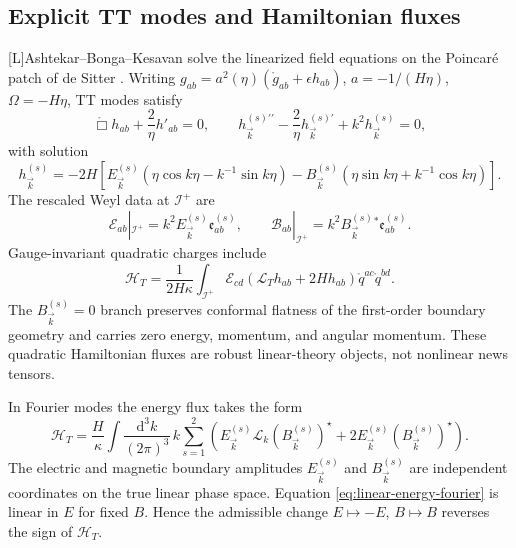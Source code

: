\documentclass[11pt,a4paper]{article}
\newcommand{\scri}{\mathscr{I}}
\newcommand{\cE}{\mathcal{E}}
\newcommand{\cB}{\mathcal{B}}
\newcommand{\cH}{\mathcal{H}}
\newcommand{\cL}{\mathcal{L}}
\newcommand{\diff}{\mathrm{d}}
\newcommand{\statusL}{\textsf{[L]}}
\begin{document}
\subsection{Explicit TT modes and Hamiltonian fluxes}

\statusL Ashtekar--Bonga--Kesavan solve the linearized field equations on the Poincaré patch of de Sitter \cite{ashtekar2015linear}.  Writing \(g_{ab}=a^2(\eta)(\mathring g_{ab}+\epsilon h_{ab})\), \(a=-1/(H\eta)\), \(\Omega=-H\eta\), TT modes satisfy
\begin{equation}
  \mathring{\Box}h_{ab}+\frac{2}{\eta}h'_{ab}=0,
  \qquad
  h_{\vec k}^{(s)\prime\prime}-\frac{2}{\eta}h_{\vec k}^{(s)\prime}+k^2h_{\vec k}^{(s)}=0,
\end{equation}
with solution
\begin{equation}
  h_{\vec k}^{(s)}
  =
  -2H\left[
    E_{\vec k}^{(s)}
    \left(\eta\cos k\eta-k^{-1}\sin k\eta\right)
    -
    B_{\vec k}^{(s)}
    \left(\eta\sin k\eta+k^{-1}\cos k\eta\right)
  \right].
\end{equation}
The rescaled Weyl data at \(\scri^+\) are
\begin{equation}
  \cE_{ab}|_{\scri^+}
  =
  k^2E_{\vec k}^{(s)}\mathfrak e^{(s)}_{ab},
  \qquad
  \cB_{ab}|_{\scri^+}
  =
  k^2B_{\vec k}^{(s)}{}^\ast\mathfrak e^{(s)}_{ab}.
\end{equation}
Gauge-invariant quadratic charges include
\begin{equation}
  \cH_T
  =
  \frac{1}{2H\kappa}
  \int_{\scri^+}
  \cE_{cd}
  \left(
    \cL_T h_{ab}+2Hh_{ab}
  \right)
  \mathring q^{ac}\mathring q^{bd}.
\end{equation}
The \(B_{\vec k}^{(s)}=0\) branch preserves conformal flatness of the first-order boundary geometry and carries zero energy, momentum, and angular momentum.  These quadratic Hamiltonian fluxes are robust linear-theory objects, not nonlinear news tensors.

In Fourier modes the energy flux takes the form \cite{ashtekar2015linear}
\begin{equation}\label{eq:linear-energy-fourier}
  \cH_T
  =
  \frac{H}{\kappa}
  \int\frac{\diff^3k}{(2\pi)^3}\,k
  \sum_{s=1}^{2}
  \left(
    E_{\vec k}^{(s)}\mathcal L_k(B_{\vec k}^{(s)})^\star
    +
    2E_{\vec k}^{(s)}(B_{\vec k}^{(s)})^\star
  \right).
\end{equation}
The electric and magnetic boundary amplitudes \(E_{\vec k}^{(s)}\) and \(B_{\vec k}^{(s)}\) are independent coordinates on the true linear phase space.  Equation \eqref{eq:linear-energy-fourier} is linear in \(E\) for fixed \(B\).  Hence the admissible change \(E\mapsto-E\), \(B\mapsto B\) reverses the sign of \(\cH_T\).
\end{document}
